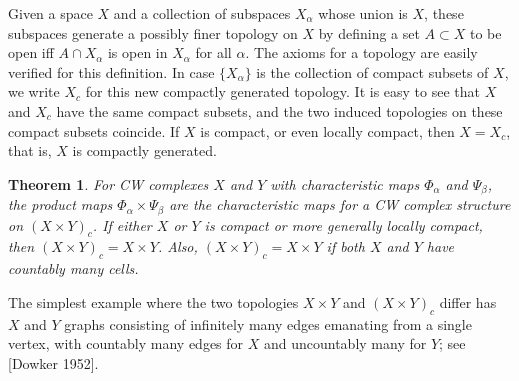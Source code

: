 \documentclass{article}
\newtheorem{theorem}{Theorem}[section]
\theoremstyle{definition}
\begin{document}
Given a space $X$ and a collection of subspaces $X_{\alpha}$ whose union is $X$, these subspaces generate a possibly finer topology on $X$ by defining a set $A \subset X$ to be open iff $A \cap X_{\alpha}$ is open in $X_{\alpha}$ for all $\alpha$. The axioms for a topology are easily verified for this definition. In case $\{X_{\alpha}\}$ is the collection of compact subsets of $X$, we write $X_{c}$ for this new compactly generated topology. It is easy to see that $X$ and $X_{c}$ have the same compact subsets, and the two induced topologies on these compact subsets coincide. If $X$ is compact, or even locally compact, then $X = X_{c}$, that is, $X$ is compactly generated.

\begin{theorem}
For CW complexes $X$ and $Y$ with characteristic maps $\Phi_{\alpha}$ and $\Psi_{\beta}$, the product maps $\Phi_{\alpha} \times \Psi_{\beta}$ are the characteristic maps for a CW complex structure on $(X \times Y)_{c}$. If either $X$ or $Y$ is compact or more generally locally compact, then $(X \times Y)_{c} = X \times Y$. Also, $(X \times Y)_{c} = X \times Y$ if both $X$ and $Y$ have countably many cells.
\end{theorem}

The simplest example where the two topologies $X \times Y$ and $(X \times Y)_{c}$ differ has $X$ and $Y$ graphs consisting of infinitely many edges emanating from a single vertex, with countably many edges for $X$ and uncountably many for $Y$; see [Dowker 1952].
\end{document}
